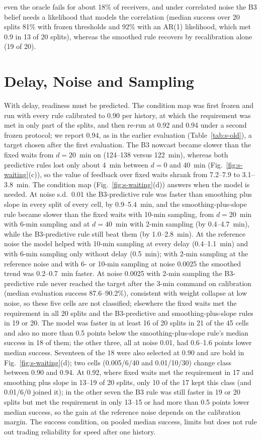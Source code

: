 \documentclass[conference]{IEEEtran}
\begin{document}
even the oracle fails for about 18\% of receivers, and under correlated noise the B3 belief needs a likelihood that models the correlation (median success over 20 splits 81\% with frozen thresholds and 92\% with an AR(1) likelihood, which met 0.9 in 13 of 20 splits), whereas the smoothed rule recovers by recalibration alone (19 of 20).

\section{Delay, Noise and Sampling}
\label{sec:s-delay}
With delay, readiness must be predicted. The condition map was first frozen and run with every rule calibrated to 0.90 per history, at which the requirement was met in only part of the splits, and then re-run at 0.92 and 0.94 under a second frozen protocol; we report 0.94, as in the earlier evaluation (Table~\ref{tab:s-old}), a target chosen after the first evaluation. The B3 nowcast became slower than the fixed waits from $d=20$~min on (124--138 versus 122~min), whereas both predictive rules lost only about 4~min between $d=0$ and 40~min (Fig.~\ref{fig:s-waiting}(c)), so the value of feedback over fixed waits shrank from 7.2--7.9 to 3.1--3.8~min. The condition map (Fig.~\ref{fig:s-waiting}(d)) answers when the model is needed. At noise s.d.\ 0.01 the B3-predictive rule was faster than smoothing plus slope in every split of every cell, by 0.9--5.4~min, and the smoothing-plus-slope rule became slower than the fixed waits with 10-min sampling, from $d=20$~min with 6-min sampling and at $d=40$~min with 2-min sampling (by 0.4--4.7~min), while the B3-predictive rule still beat them (by 1.0--2.8~min). At the reference noise the model helped with 10-min sampling at every delay (0.4--1.1~min) and with 6-min sampling only without delay (0.5~min); with 2-min sampling at the reference noise and with 6- or 10-min sampling at noise 0.0025 the smoothed trend was 0.2--0.7~min faster. At noise 0.0025 with 2-min sampling the B3-predictive rule never reached the target after the 3-min command on calibration (median evaluation success 87.6--90.2\%), consistent with weight collapse at low noise, so these five cells are not classified; elsewhere the fixed waits met the requirement in all 20 splits and the B3-predictive and smoothing-plus-slope rules in 19 or 20. The model was faster in at least 16 of 20 splits in 21 of the 45 cells and also no more than 0.5 points below the smoothing-plus-slope rule's median success in 18 of them; the other three, all at noise 0.01, had 0.6--1.6 points lower median success. Seventeen of the 18 were also selected at 0.90 and are bold in Fig.~\ref{fig:s-waiting}(d); two cells (0.005/6/40 and 0.01/10/30) change class between 0.90 and 0.94. At 0.92, where fixed waits met the requirement in 17 and smoothing plus slope in 13--19 of 20 splits, only 10 of the 17 kept this class (and 0.01/6/0 joined it); in the other seven the B3 rule was still faster in 19 or 20 splits but met the requirement in only 13--15 or had more than 0.5 points lower median success, so the gain at the reference noise depends on the calibration margin. The success condition, on pooled median success, limits but does not rule out trading reliability for speed after one history.
\end{document}
